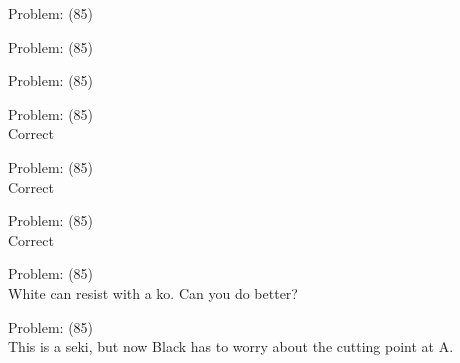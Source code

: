 \documentclass[11pt]{article}
\begin{document}
\begin{minipage}[t]{0.5\textwidth}
  {\centering
  
Problem: (85)\\
  }
\end{minipage}
\begin{minipage}[t]{0.5\textwidth}
  {\centering
  
Problem: (85)\\
  }
\end{minipage}
\begin{minipage}[t]{0.5\textwidth}
  {\centering
  
Problem: (85)\\
  }
\end{minipage}
\begin{minipage}[t]{0.5\textwidth}
  {\centering
  
Problem: (85)\\
Correct\\
  }
\end{minipage}
\begin{minipage}[t]{0.5\textwidth}
  {\centering
  
Problem: (85)\\
Correct\\
  }
\end{minipage}
\begin{minipage}[t]{0.5\textwidth}
  {\centering
  
Problem: (85)\\
Correct\\
  }
\end{minipage}
\begin{minipage}[t]{0.5\textwidth}
  {\centering
  
Problem: (85)\\
White can resist with a ko. Can you do better?\\
  }
\end{minipage}
\begin{minipage}[t]{0.5\textwidth}
  {\centering
  
Problem: (85)\\
This is a seki, but now Black has to worry about the cutting point at A.\\
  }
\end{minipage}
\end{document}
